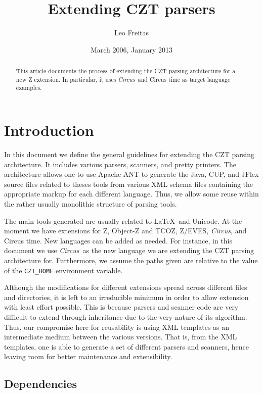 \documentclass{article}
\newcommand{\Circus}{\textsf{\textit{Circus}}}
\begin{document}
\title{Extending CZT parsers}
\author{Leo Freitas}
\date{March 2006, January 2013}

\maketitle

\begin{abstract}
    \noindent This article documents the process of extending the CZT parsing architecture
    for a new Z extension. In particular, it uses \Circus\ and Circus time as target language
    examples.
\end{abstract}

\section{Introduction}\label{introduction}

In this document we define the general guidelines for extending the CZT parsing
architecture. It includes various parsers, scanners, and pretty printers. The
architecture allows one to use Apache ANT to generate the Java, CUP, and JFlex
source files related to theses tools from various XML schema files containing
the appropriate markup for each different language. Thus, we allow some reuse
within the rather usually monolithic structure of parsing tools.

The main tools generated are usually related to \LaTeX\ and Unicode. At the
moment we have  extensions for Z, Object-Z and TCOZ, Z/EVES, \Circus, and Circus time. 
New languages can be added as needed. For instance, in this document we use \Circus\ as the new
language we are extending the CZT parsing architecture for. Furthermore, we
assume the paths given are relative to the value of the \texttt{CZT\_HOME}
environment variable.

Although the modifications for different extensions spread across different
files and directories, it is left to an irreducible minimum in order to allow
extension with least effort possible. This is because parsers and scanner code
are very difficult to extend through inheritance due to the very nature of its
algorithm. Thus, our compromise here for reusability is using XML templates as
an intermediate medium between the various versions. That is, from the XML
templates, one is able to generate a set of different parsers and scanners,
hence leaving room for better maintenance and extensibility.

\subsection{Dependencies}
\end{document}
